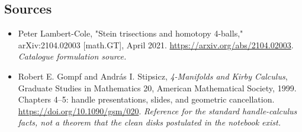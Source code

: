\documentclass[11pt,a4paper]{article}
\numberwithin{equation}{section}
\begin{document}
\subsection{Sources}
\begin{itemize}\raggedright
\item[\textnormal{[S1]}]\hypertarget{source:165:1}{} Peter Lambert-Cole, "Stein trisections and homotopy 4-balls," arXiv:2104.02003 [math.GT], April 2021.
\url{https://arxiv.org/abs/2104.02003}.
{\small\textit{Catalogue formulation source.}}
\item[\textnormal{[E1]}]\hypertarget{extra:165:1}{} Robert E. Gompf and Andr\'as I. Stipsicz, \emph{4-Manifolds and Kirby Calculus}, Graduate Studies in Mathematics 20, American Mathematical Society, 1999. Chapters 4--5: handle presentations, slides, and geometric cancellation.
\url{https://doi.org/10.1090/gsm/020}.
{\small\textit{Reference for the standard handle-calculus facts, not a theorem that the clean disks postulated in the notebook exist.}}
\end{itemize}
\end{document}
